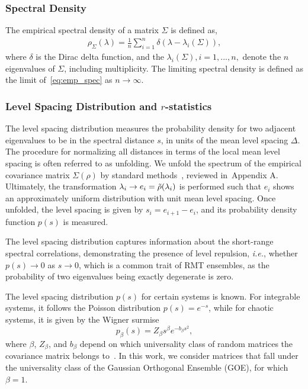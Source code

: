 \documentclass{article}
\def \d {\delta}
\begin{document}


\subsubsection{Spectral Density}

The empirical spectral density of a matrix $\Sigma$ is defined as,
\begin{align}\label{eq:emp_spec}
    \rho_\Sigma(\lambda)
=\frac{1}{n}\sum_{i=1}^n
\delta(\lambda - \lambda_i(\Sigma)),
\end{align}
where $\d$ is the Dirac delta function, and the $\lambda_i (\Sigma), i = 1, . . . , n,$ denote the $n$ eigenvalues of $\Sigma$,
including multiplicity. The limiting spectral density is defined as the limit of~\cref{eq:emp_spec} as $n \to \infty$.



\subsubsection{Level Spacing Distribution and $r$-statistics}
The level spacing distribution measures the probability density for two adjacent eigenvalues to be in the spectral distance $s$, in units of the mean level spacing $\Delta$.
The procedure for normalizing all distances in terms of the local mean level spacing is often referred to as unfolding.
We unfold the spectrum of the empirical covariance matrix $\Sigma(\rho)$ by standard methods~\cite{Kim_2023}, reviewed in~Appendix A.
Ultimately, the transformation $\lambda_i \to e_i = \Tilde{\rho}(\lambda_i) $ is performed such that $e_i$ shows an approximately uniform distribution with unit mean level spacing.
Once unfolded, the level spacing is given by $s_{i} = e_{i+1}-e_i$, and its probability density function $p(s)$ is measured. 

The level spacing distribution captures information about the short-range spectral correlations, demonstrating the presence of level repulsion, \textit{i.e.}, whether $p(s)\rightarrow 0$ as $s\rightarrow 0$, which is a common trait of RMT ensembles, as the probability of two eigenvalues being exactly degenerate is zero.

The level spacing distribution $p(s)$ for certain systems is known. For integrable systems, it follows the Poisson distribution $p(s) = e^{-s}$, while for chaotic systems, it is given by the Wigner surmise
\begin{equation}
p_{\beta}(s) = Z_\beta{s^{\beta} e^{-b_{\beta}s^2}},
\label{Wigner}
\end{equation}
where $\beta$, $Z_\beta$, and $b_\beta$ depend on which universality class of random matrices the covariance matrix belongs to~\cite{mehta_book}. In this work, we consider matrices that fall under the universality class of the Gaussian Orthogonal Ensemble (GOE), for which $\beta=1$.
\end{document}
